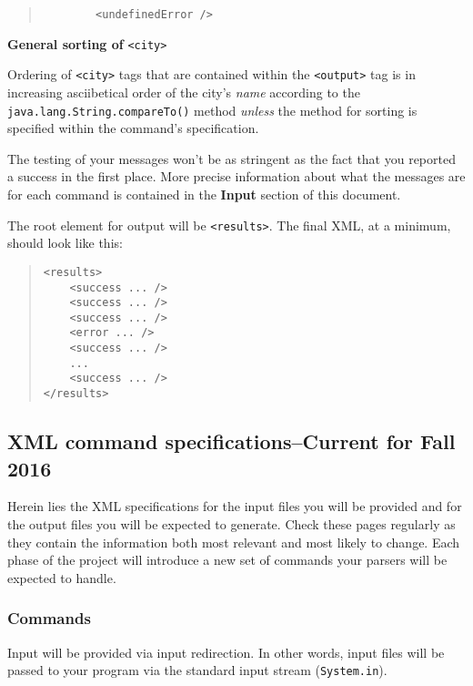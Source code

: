 \documentclass[12pt]{article}
\newenvironment{Description}
   {\begin{list}{}{\let\makelabel\Descriptionlabel
      \setlength\leftmargin{\labelwidth+\labelsep}
      \setlength\itemindent{-0.3em}}}%
   {\end{list}}
\newcommand*{\Descriptionlabel}[1]{%
  \parbox[b]{\labelwidth}
  {\makebox[0pt][l]{\textbf{#1}}\\}
  \hfill}
\begin{document}
\begin{Description}
	\begin{quote}
	\begin{verbatim}
		<undefinedError />
	\end{verbatim}
	\end{quote}

	\item[\textbf{General sorting of} \texttt{<city>}]

	Ordering of \texttt{<city>} tags that are contained within the
	\texttt{<output>} tag is in increasing asciibetical order of
	the city's \emph{name} according to the
	\texttt{java.lang.String.compareTo()} method \emph{unless} the
	method for sorting is specified within the command's
	specification.

\end{Description}

The testing of your messages won't be as stringent as the fact that
you reported a success in the first place.  More precise information
about what the messages are for each command is contained in the \textbf{Input} section of this document.

The root element for output will be \texttt{<results>}.  The
final XML, at a minimum, should look like this:

\begin{quote}
\begin{verbatim}
<results>
    <success ... />
    <success ... />
    <success ... />
    <error ... />
    <success ... />
    ...
    <success ... />
</results>
\end{verbatim}
\end{quote}


\subsection{XML command specifications--Current for Fall 2016}

Herein lies the XML specifications for the input files you
will be provided and for the output files you will be expected to
generate.  Check these pages regularly as they contain the information
both most relevant and most likely to change.  Each phase of the
project will introduce a new set of commands your parsers will be
expected to handle.

\subsubsection{Commands}

Input will be provided via input redirection.  In other words, input
files will be passed to your program via the standard input stream
(\texttt{System.in}).
\end{document}
